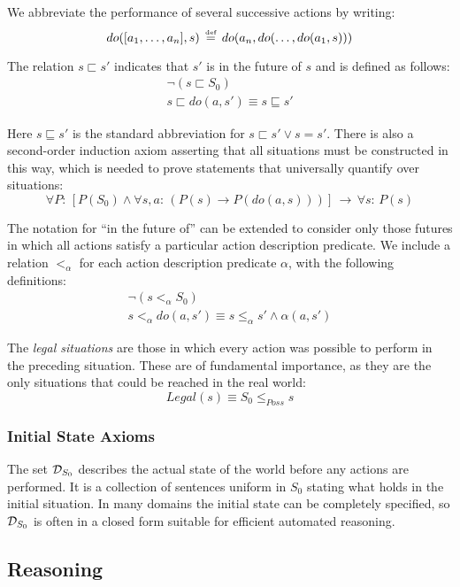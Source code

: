 We abbreviate the performance of several successive actions by writing:\[
do([a_{1},\dots,a_{n}],s)\,\stackrel{\mbox{\tiny def}}{=}\, do(a_{n},do(\dots,do(a_{1},s)))\]


The relation $s\sqsubset s'$ indicates that $s'$ is in the future
of $s$ and is defined as follows:\begin{gather*}
\neg(s\sqsubset S_{0})\\
s\sqsubset do(a,s')\equiv s\sqsubseteq s'\end{gather*}


Here $s\sqsubseteq s'$ is the standard abbreviation for $s\sqsubset s'\vee s=s'$.
There is also a second-order induction axiom asserting that all situations
must be constructed in this way, which is needed to prove statements
that universally quantify over situations:\[
\forall P:\,\left[P(S_{0})\wedge\forall s,a:\,\left(P(s)\rightarrow P(do(a,s))\right)\right]\,\rightarrow\,\forall s:\, P(s)\]


The notation for {}``in the future of'' can be extended to consider
only those futures in which all actions satisfy a particular action
description predicate. We include a relation $<_{\alpha}$ for each
action description predicate $\alpha$, with the following definitions:\begin{gather*}
\neg\left(s<_{\alpha}S_{0}\right)\\
s<_{\alpha}do(a,s')\equiv s\leq_{\alpha}s'\wedge\alpha(a,s')\end{gather*}


The \emph{legal situations} are those in which every action was possible
to perform in the preceding situation. These are of fundamental importance,
as they are the only situations that could be reached in the real
world:\[
Legal(s)\equiv S_{0}\leq_{Poss}s\]



\subsubsection{Initial State Axioms}

The set $\mathcal{D}_{S_{0}}$ describes the actual state of the world before
any actions are performed. It is a collection of sentences uniform
in $S_{0}$ stating what holds in the initial situation. In many domains
the initial state can be completely specified, so $\mathcal{D}_{S_{0}}$ is
often in a closed form suitable for efficient automated reasoning.


\subsection{Reasoning}

